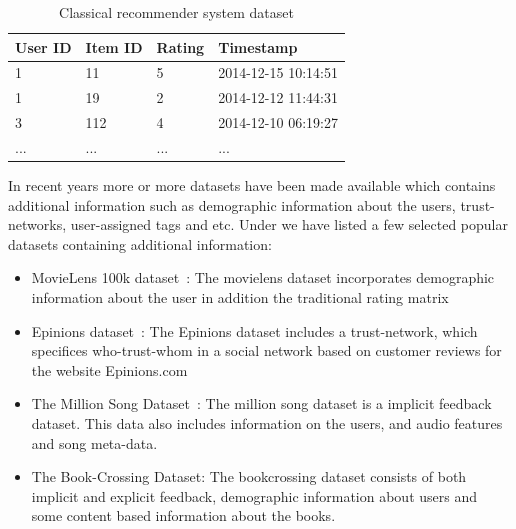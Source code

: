 \begin{table}[H]
\centering
	\begin{tabular}{*{4}l}
	\toprule
		User ID & Item ID & Rating & Timestamp \\ \midrule
		1		&	11	  &	5	  &  2014-12-15 10:14:51 \\
		1		&	19	  &	2	  &  2014-12-12 11:44:31 \\
		3		&	112	  &	4	  &  2014-12-10 06:19:27 \\
		...		&	...	  &	...	  &  ... \\
	\bottomrule
	\end{tabular}
\caption{Classical recommender system dataset}
\end{table}

In recent years more or more datasets have been made available which contains
additional information such as demographic information about the users,
trust-networks, user-assigned tags and etc. Under we have listed a few selected
popular datasets containing additional information:

\begin{itemize}

\item MovieLens 100k dataset~\cite{Movielens}: The movielens dataset
	incorporates demographic information about the user in addition the
	traditional rating matrix

\item Epinions dataset~\cite{Epinions}: The Epinions dataset includes a
	trust-network, which specifices who-trust-whom in a social network based on
	customer reviews for the website Epinions.com

\item The Million Song Dataset~\cite{Bertin-Mahieux2011}: The million song
	dataset is a implicit feedback dataset. This data also includes information on the users,
	and audio features and song meta-data.

\item The Book-Crossing Dataset: The bookcrossing dataset consists of both implicit and explicit feedback,
	demographic information about users and some content based information about the books.
\end{itemize}

